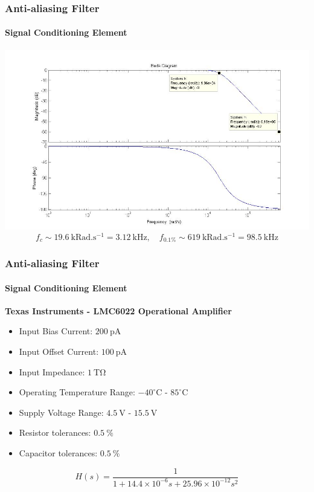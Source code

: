 \documentclass{beamer}
\begin{document}
\begin{frame}
\frametitle{Anti-aliasing Filter}
\framesubtitle{Signal Conditioning Element}
\centering
\includegraphics[height=0.73\textheight]{filterBode} 
\begin{displaymath}    
f_c \sim 19.6~\mathrm{kRad.s^{-1}} = 3.12~\mathrm{kHz}, \quad f_{0.1\%} \sim 619~\mathrm{kRad.s^{-1}} = 98.5~\mathrm{kHz}
\end{displaymath}

\end{frame}

\begin{frame}
\frametitle{Anti-aliasing Filter}
\framesubtitle{Signal Conditioning Element}

\textbf{Texas Instruments - LMC6022 Operational Amplifier}
\begin{itemize}
	\item Input Bias Current: $200~\mathrm{pA}$
	\item Input Offset Current: $100~\mathrm{pA}$
	\item Input Impedance: $1~\mathrm{T\Omega}$
	\item Operating Temperature Range: $-40^\circ \mathrm{C}$ - $85^\circ \mathrm{C}$
	\item Supply Voltage Range: $4.5~\mathrm{V}$ - $15.5~\mathrm{V}$
	\item Resistor tolerances: $0.5~\%$ 
	\item Capacitor tolerances: $0.5~\%$
\end{itemize}

\begin{displaymath}    
H(s) = \frac{1}{1 + 14.4 \times 10^{-6}s + 25.96 \times 10^{-12}s^2}
\end{displaymath}

\end{frame}
\end{document}

